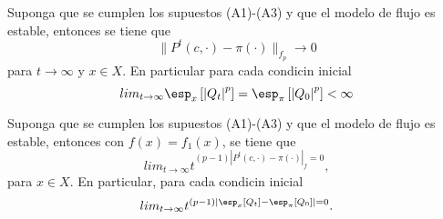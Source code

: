 \begin{Teo}\label{Tma.6.2}
Suponga que se cumplen los supuestos (A1)-(A3) y que el modelo de
flujo es estable, entonces se tiene que
\[\parallel P^{t}\left(c,\cdot\right)-\pi\left(\cdot\right)\parallel_{f_{p}}\rightarrow0\]
para $t\rightarrow\infty$ y $x\in X$. En particular para cada
condicin inicial
\[lim_{t\rightarrow\infty}\esp_{x}\left[\left|Q_{t}\right|^{p}\right]=\esp_{\pi}\left[\left|Q_{0}\right|^{p}\right]<\infty\]
\end{Teo}


\begin{Teo}\label{Tma.6.3}
Suponga que se cumplen los supuestos (A1)-(A3) y que el modelo de
flujo es estable, entonces con
$f\left(x\right)=f_{1}\left(x\right)$, se tiene que
\[lim_{t\rightarrow\infty}t^{(p-1)\left|P^{t}\left(c,\cdot\right)-\pi\left(\cdot\right)\right|_{f}=0},\]
para $x\in X$. En particular, para cada condicin inicial
\[lim_{t\rightarrow\infty}t^{(p-1)\left|\esp_{x}\left[Q_{t}\right]-\esp_{\pi}\left[Q_{0}\right]\right|=0}.\]
\end{Teo}



